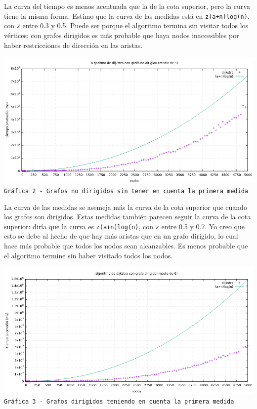 \documentclass[12pt , a4paper]{article}
\begin{document}
	La curva del tiempo es menos acentuada que la de la cota superior, pero la curva tiene la misma forma. Estimo que la curva de las medidas está en \texttt{z(a+n)log(n)}, con \texttt{z} entre 0.3 y 0.5. Puede ser porque el algoritmo termina sin visitar todos los vértices: con grafos dirigidos es más probable que haya nodos inaccesibles por haber restricciones de dirección en las aristas. 
	
	
	\newpage
	\hspace*{-.15\linewidth}
	\includegraphics[width=1.25\hsize]{nodir5.png}
	\texttt{Gráfica 2 - Grafos no dirigidos sin tener en cuenta la primera medida}
	\newline	
	
	La curva de las medidas se asemeja más la curva de la cota superior que cuando los grafos son dirigidos. Estas medidas también parecen seguir la curva de la cota superior: diría que la curva es \texttt{z(a+n)log(n)}, con \texttt{z} entre 0.5 y 0.7.  Yo creo que esto se debe al hecho de que hay más aristas que en un grafo dirigido, lo cual hace más probable que todos los nodos sean alcanzables. Es menos probable que el algoritmo termine sin haber visitado todos los nodos.


	\newpage
	\hspace*{-.15\linewidth}
	\includegraphics[width=1.25\hsize]{dir6.png}
	\texttt{Gráfica 3 - Grafos dirigidos teniendo en cuenta la primera medida}
	\newline
	
\end{document}
